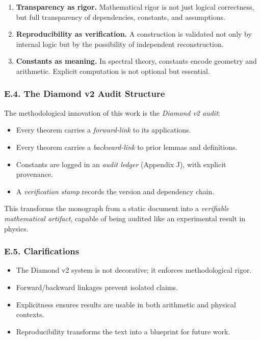 \begin{enumerate}[label=\arabic*.]
  \item \textbf{Transparency as rigor.}
        Mathematical rigor is not just logical correctness,
        but full transparency of dependencies, constants, and assumptions.

  \item \textbf{Reproducibility as verification.}
        A construction is validated not only by internal logic
        but by the possibility of independent reconstruction.

  \item \textbf{Constants as meaning.}
        In spectral theory, constants encode geometry and arithmetic.
        Explicit computation is not optional but essential.
\end{enumerate}

\subsubsection*{E.4. The Diamond v2 Audit Structure}

The methodological innovation of this work is the \emph{Diamond v2 audit}:
\begin{itemize}
  \item Every theorem carries a \emph{forward-link} to its applications.
  \item Every theorem carries a \emph{backward-link} to prior lemmas and definitions.
  \item Constants are logged in an \emph{audit ledger} (Appendix J),
        with explicit provenance.
  \item A \emph{verification stamp} records the version and dependency chain.
\end{itemize}

This transforms the monograph from a static document into a
\emph{verifiable mathematical artifact},
capable of being audited like an experimental result in physics.

\subsubsection*{E.5. Clarifications}

\begin{itemize}
  \item The Diamond v2 system is not decorative; it enforces methodological rigor.
  \item Forward/backward linkages prevent isolated claims.
  \item Explicitness ensures results are usable in both arithmetic and physical contexts.
  \item Reproducibility transforms the text into a blueprint for future work.
\end{itemize}

